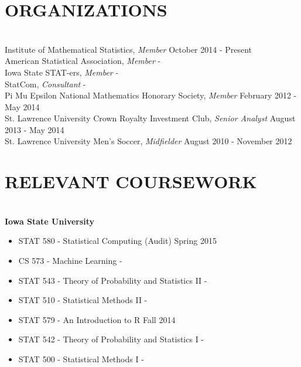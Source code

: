 \documentclass[10pt]{res} %
\begin{document}
\begin{CJK*}{UTF8}{gbsn}
\begin{resume}

\section{ORGANIZATIONS}

\hrulefill \\
Institute of Mathematical Statistics, {\sl Member} \hfill October 2014 - Present \\
American Statistical Association, {\sl Member} \hfill - \\
Iowa State STAT-ers, {\sl Member} \hfill - \\
StatCom, {\sl Consultant} \hfill - \\
Pi Mu Epsilon National Mathematics Honorary Society, {\sl Member} \hfill February 2012 - May 2014 \\
St. Lawrence University Crown Royalty Investment Club, {\sl Senior Analyst} \hfill August 2013 - May 2014 \\
St. Lawrence University Men's Soccer, {\sl Midfielder} \hfill August 2010 - November 2012 


\section{RELEVANT COURSEWORK}

\hrulefill \\
{\bf Iowa State University }
\begin{itemize}\itemsep -2pt
\item STAT 580 - Statistical Computing (Audit) \hfill Spring 2015
\item CS 573 - Machine Learning \hfill -
\item STAT 543 - Theory of Probability and Statistics II \hfill -
\item STAT 510 - Statistical Methods II \hfill -
\item STAT 579 - An Introduction to R \hfill Fall 2014
\item STAT 542 - Theory of Probability and Statistics I \hfill -
\item STAT 500 - Statistical Methods I \hfill -
\end{itemize}


\end{resume}
\end{CJK*}
\end{document}
